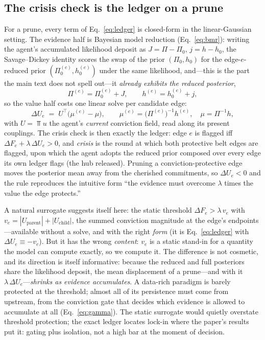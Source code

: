 \subsection{The crisis check is the ledger on a prune}

For a prune, every term of Eq.~\eqref{eq:ledger} is closed-form in the linear-Gaussian setting.
The evidence half is Bayesian model reduction (Eq.~\ref{eq:bmr}): writing the agent's
accumulated likelihood deposit as $J=\Pi-\Pi_0$, $j=h-h_0$, the Savage--Dickey identity scores
the swap of the prior $(\Pi_0,h_0)$ for the edge-$e$-reduced prior $(\Pi_0^{(e)},h_0^{(e)})$
under the same likelihood, and---this is the part the main text does not spell out---it
\emph{already exhibits the reduced posterior},
\begin{equation}
\Pi^{(e)} = \Pi_0^{(e)} + J,
\qquad
h^{(e)} = h_0^{(e)} + j ,
\end{equation}
so the value half costs one linear solve per candidate edge:
\begin{equation}
\Delta U_e \;=\; U^{\!\top}\!\bigl(\mu^{(e)}-\mu\bigr),
\qquad
\mu^{(e)} = \bigl(\Pi^{(e)}\bigr)^{-1}h^{(e)},\quad \mu = \Pi^{-1}h,
\label{eq:dU-prune}
\end{equation}
with $U=\Top u$ the agent's \emph{current} conviction field, read along its present couplings.
The crisis check is then exactly the ledger: edge $e$ is flagged iff
$\Delta F_e + \lambda\,\Delta U_e > 0$, and \emph{crisis} is the round at which both protective
belt edges are flagged, upon which the agent adopts the reduced prior composed over every edge
its own ledger flags (the hub released). Pruning a conviction-protective edge moves the
posterior mean away from the cherished commitments, so $\Delta U_e<0$ and the rule reproduces
the intuitive form ``the evidence must overcome $\lambda$ times the value the edge protects.''

A natural surrogate suggests itself here: the static threshold $\Delta F_e > \lambda\,v_e$ with
$v_e = |U_{\mathrm{parent}}|+|U_{\mathrm{child}}|$, the summed conviction magnitude at the
edge's endpoints---available without a solve, and with the
right \emph{form} (it is Eq.~\eqref{eq:ledger} with $\Delta U_e \equiv -v_e$). But it has the
wrong \emph{content}: $v_e$ is a static stand-in for a quantity the model can compute exactly,
so we compute it. The difference is not cosmetic, and its direction is itself informative:
because the reduced and full posteriors share the likelihood deposit, the mean displacement of
a prune---and with it $\lambda\,\Delta U_e$---\emph{shrinks as evidence accumulates}. A
data-rich paradigm is barely protected at the threshold; almost all of its persistence must
come from upstream, from the conviction gate that decides which evidence is allowed to
accumulate at all (Eq.~\ref{eq:gamma}). The static surrogate would quietly overstate threshold
protection; the exact ledger locates lock-in where the paper's results put it: gating plus
isolation, not a high bar at the moment of decision.

